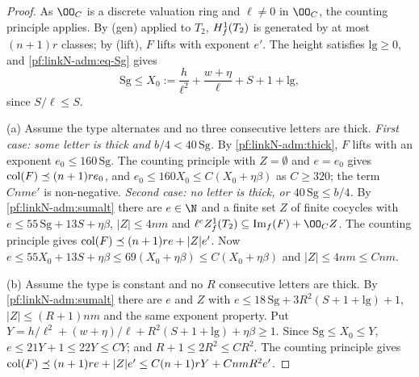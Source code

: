 \begin{proof}
As $\OO_C$ is a discrete valuation ring and $\ell\ne0$ in $\OO_C$, the counting principle applies. By (gen) applied to $T_2$,
$H^1_{f}(T_2)$ is generated by at most $(n+1)r$ classes; by (lift), $F$ lifts with exponent $e'$. The height satisfies
$\mathrm{lg}\ge0$, and \eqref{pf:linkN-adm:eq-Sg} gives
\begin{equation}\label{pf:linkN-adm:eq-Sgle}
\mathrm{Sg}\le X_0:=\frac h{\ell^2}+\frac{w+\eta}{\ell}+S+1+\mathrm{lg},
\end{equation}
since $S/\ell\le S$.

(a) Assume the type alternates and no three consecutive letters are thick.
\emph{First case: some letter is thick and $b/4<40\,\mathrm{Sg}$.} By \cref{pf:linkN-adm:thick}, $F$ lifts with an exponent
$e_0\le160\,\mathrm{Sg}$. The counting principle with $Z=\emptyset$ and $e=e_0$ gives $\operatorname{col}(F)\preceq(n+1)re_0$,
and $e_0\le160X_0\le C(X_0+\eta\beta)$ as $C\ge320$; the term $Cnme'$ is non-negative.
\emph{Second case: no letter is thick, or $40\,\mathrm{Sg}\le b/4$.} By \cref{pf:linkN-adm:sumalt} there are $e\in\N$ and a
finite set $Z$ of finite cocycles with $e\le55\,\mathrm{Sg}+13S+\eta\beta$, $|Z|\le4nm$ and
$\ell^e\linkNadmZf(T_2)\subseteq\linkNadmIm(F)+\OO_CZ$. The counting principle gives $\operatorname{col}(F)\preceq(n+1)re+|Z|e'$.
Now $e\le55X_0+13S+\eta\beta\le69(X_0+\eta\beta)\le C(X_0+\eta\beta)$ and $|Z|\le4nm\le Cnm$.

(b) Assume the type is constant and no $R$ consecutive letters are thick. By \cref{pf:linkN-adm:sumalt} there are $e$ and
$Z$ with $e\le18\,\mathrm{Sg}+3R^2(S+1+\mathrm{lg})+1$, $|Z|\le(R+1)nm$ and the same exponent property. Put
$Y=h/\ell^2+(w+\eta)/\ell+R^2(S+1+\mathrm{lg})+\eta\beta\ge1$. Since $\mathrm{Sg}\le X_0\le Y$, $e\le21Y+1\le22Y\le CY$; and
$R+1\le2R^2\le CR^2$. The counting principle gives $\operatorname{col}(F)\preceq(n+1)re+|Z|e'\le C(n+1)rY+CnmR^2e'$.
\end{proof}


